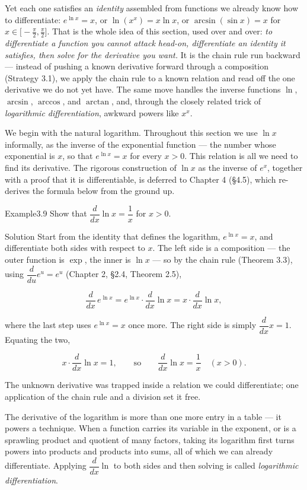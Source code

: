 Yet each one satisfies an \emph{identity} assembled from functions we already know how to differentiate: \(e^{\ln x} = x\), or \(\ln(x^{x}) = x\ln x\), or \(\arcsin(\sin x) = x\) for \(x \in \bigl[-\tfrac{\pi}{2}, \tfrac{\pi}{2}\bigr]\). That is the whole idea of this section, used over and over: \emph{to differentiate a function you cannot attack head-on, differentiate an identity it satisfies, then solve for the derivative you want.} It is the chain rule run backward — instead of pushing a known derivative forward through a composition (Strategy 3.1), we apply the chain rule to a known relation and read off the one derivative we do not yet have. The same move handles the inverse functions \(\ln\), \(\arcsin\), \(\arccos\), and \(\arctan\), and, through the closely related trick of \emph{logarithmic differentiation}, awkward powers like \(x^{x}\).

We begin with the natural logarithm. Throughout this section we use \(\ln x\) informally, as the inverse of the exponential function — the number whose exponential is \(x\), so that \(e^{\ln x} = x\) for every \(x > 0\). This relation is all we need to find its derivative. The rigorous construction of \(\ln x\) as the inverse of \(e^{x}\), together with a proof that it is differentiable, is deferred to Chapter 4 (§4.5), which re-derives the formula below from the ground up.

\begin{hkworkedexample}
\begin{hkexample}{Example}{3.9}{}
Show that \(\dfrac{d}{dx}\ln x = \dfrac{1}{x}\) for \(x > 0\).
\end{hkexample}
\begin{hksolution}{Solution}{}{}
Start from the identity that defines the logarithm, \(e^{\ln x} = x\), and differentiate both sides with respect to \(x\). The left side is a composition — the outer function is \(\exp\), the inner is \(\ln x\) — so by the chain rule (Theorem 3.3), using \(\dfrac{d}{du}e^{u} = e^{u}\) (Chapter 2, §2.4, Theorem 2.5),

\[ \frac{d}{dx}\,e^{\ln x} = e^{\ln x}\cdot\frac{d}{dx}\ln x = x\cdot\frac{d}{dx}\ln x, \]

where the last step uses \(e^{\ln x} = x\) once more. The right side is simply \(\dfrac{d}{dx}x = 1\). Equating the two,

\[ x\cdot\frac{d}{dx}\ln x = 1, \qquad\text{so}\qquad \frac{d}{dx}\ln x = \frac{1}{x} \quad (x > 0). \]

The unknown derivative was trapped inside a relation we could differentiate; one application of the chain rule and a division set it free.
\end{hksolution}
\end{hkworkedexample}
The derivative of the logarithm is more than one more entry in a table — it powers a technique. When a function carries its variable in the exponent, or is a sprawling product and quotient of many factors, taking its logarithm first turns powers into products and products into sums, all of which we can already differentiate. Applying \(\dfrac{d}{dx}\ln\) to both sides and then solving is called \emph{logarithmic differentiation}.

